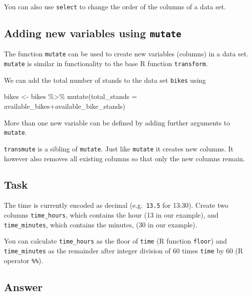 \documentclass[
]{book}
\newenvironment{Shaded}{\begin{snugshade}}{\end{snugshade}}
\newcommand{\AttributeTok}[1]{\textcolor[rgb]{0.77,0.63,0.00}{#1}}
\newcommand{\FunctionTok}[1]{\textcolor[rgb]{0.00,0.00,0.00}{#1}}
\newcommand{\NormalTok}[1]{#1}
\newcommand{\OtherTok}[1]{\textcolor[rgb]{0.56,0.35,0.01}{#1}}
\newcommand{\SpecialCharTok}[1]{\textcolor[rgb]{0.00,0.00,0.00}{#1}}
\begin{document}
You can also use \texttt{select} to change the order of the columns of a data set.

\hypertarget{adding-new-variables-using-mutate}{%
\subsection{\texorpdfstring{Adding new variables using \texttt{mutate}}{Adding new variables using mutate}}\label{adding-new-variables-using-mutate}}

The function \texttt{mutate} can be used to create new variables (columns) in a data set. \texttt{mutate} is similar in functionality to the base R function \texttt{transform}.

We can add the total number of stands to the data set \texttt{bikes} using

\begin{Shaded}
\begin{Highlighting}[]
\NormalTok{bikes }\OtherTok{\textless{}{-}}\NormalTok{ bikes }\SpecialCharTok{\%\textgreater{}\%}
           \FunctionTok{mutate}\NormalTok{(}\AttributeTok{total\_stands =}\NormalTok{ available\_bikes}\SpecialCharTok{+}\NormalTok{available\_bike\_stands)}
\end{Highlighting}
\end{Shaded}

More than one new variable can be defined by adding further arguments to \texttt{mutate}.

\texttt{transmute} is a sibling of \texttt{mutate}. Just like \texttt{mutate} it creates new columns. It however also removes all existing columns so that only the new columns remain.

\hypertarget{task-4}{%
\subsection{Task}\label{task-4}}

The time is currently encoded as decimal (e.g.~\texttt{13.5} for 13:30). Create two columns \texttt{time\_hours}, which contains the hour (13 in our example), and \texttt{time\_minutes}, which contains the minutes, (30 in our example).

You can calculate \texttt{time\_hours} as the floor of \texttt{time} (R function \texttt{floor}) and \texttt{time\_minutes} as the remainder after integer division of 60 times \texttt{time} by 60 (R operator \texttt{\%\%}).

\hypertarget{answer-3}{%
\subsection{Answer}\label{answer-3}}
\end{document}
